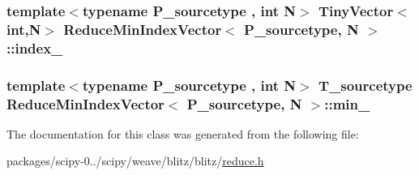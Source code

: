 \subsubsection[{index\+\_\+}]{\setlength{\rightskip}{0pt plus 5cm}template$<$typename P\+\_\+sourcetype , int N$>$ {\bf Tiny\+Vector}$<$int,{\bf N}$>$ {\bf Reduce\+Min\+Index\+Vector}$<$ P\+\_\+sourcetype, {\bf N} $>$\+::index\+\_\+\hspace{0.3cm}{\ttfamily [protected]}}\label{classReduceMinIndexVector_a33054f6c7de30b79eaae6cf37e1e689e}
\hypertarget{classReduceMinIndexVector_a4af67907330e5b438af07b9c5d39ecf1}{}
\subsubsection[{min\+\_\+}]{\setlength{\rightskip}{0pt plus 5cm}template$<$typename P\+\_\+sourcetype , int N$>$ {\bf T\+\_\+sourcetype} {\bf Reduce\+Min\+Index\+Vector}$<$ P\+\_\+sourcetype, {\bf N} $>$\+::min\+\_\+\hspace{0.3cm}{\ttfamily [protected]}}\label{classReduceMinIndexVector_a4af67907330e5b438af07b9c5d39ecf1}


The documentation for this class was generated from the following file\+:\begin{DoxyCompactItemize}
\item 
packages/scipy-\/0../scipy/weave/blitz/blitz/\hyperlink{reduce_8h}{reduce.\+h}\end{DoxyCompactItemize}
